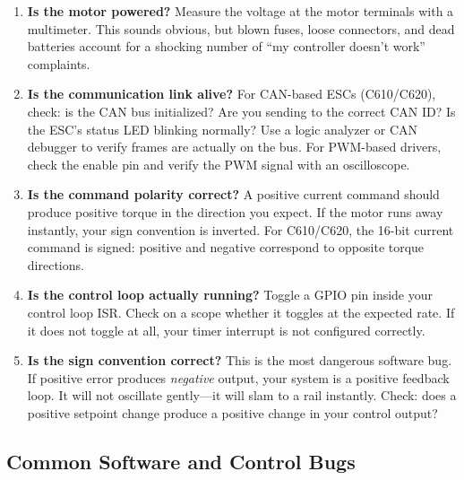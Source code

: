 \begin{enumerate}
    \item \textbf{Is the motor powered?} Measure the voltage at the motor terminals with a multimeter. This sounds obvious, but blown fuses, loose connectors, and dead batteries account for a shocking number of ``my controller doesn't work'' complaints.

    \item \textbf{Is the communication link alive?} For CAN-based ESCs (C610/C620), check: is the CAN bus initialized? Are you sending to the correct CAN ID? Is the ESC's status LED blinking normally? Use a logic analyzer or CAN debugger to verify frames are actually on the bus. For PWM-based drivers, check the enable pin and verify the PWM signal with an oscilloscope.

    \item \textbf{Is the command polarity correct?} A positive current command should produce positive torque in the direction you expect. If the motor runs away instantly, your sign convention is inverted. For C610/C620, the 16-bit current command is signed: positive and negative correspond to opposite torque directions.

    \item \textbf{Is the control loop actually running?} Toggle a GPIO pin inside your control loop ISR. Check on a scope whether it toggles at the expected rate. If it does not toggle at all, your timer interrupt is not configured correctly.

    \item \textbf{Is the sign convention correct?} This is the most dangerous software bug. If positive error produces \textit{negative} output, your system is a positive feedback loop. It will not oscillate gently---it will slam to a rail instantly. Check: does a positive setpoint change produce a positive change in your control output?
\end{enumerate}

\subsection{Common Software and Control Bugs}

